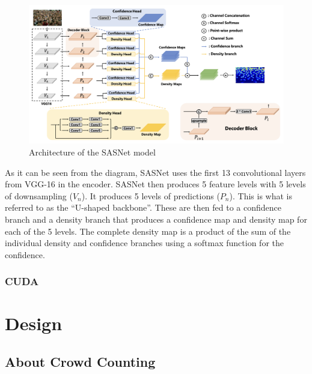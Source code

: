 \documentclass[
]{article}
\begin{document}
\begin{figure}

{\centering \includegraphics{../images/sasnet-architechture.png}

}

\caption{\label{fig-sasnet}Architecture of the SASNet model
\autocite[Diagram from][]{sasnet}}

\end{figure}

As it can be seen from the diagram, SASNet uses the first 13
convolutional layers from VGG-16 \autocite{simonyan2014very} in the
encoder. SASNet then produces 5 feature levels with 5 levels of
downsampling (\(V_n\)). It produces 5 levels of predictions (\(P_n\)).
This is what is referred to as the ``U-shaped backbone''. These are then
fed to a confidence branch and a density branch that produces a
confidence map and density map for each of the 5 levels. The complete
density map is a product of the sum of the individual density and
confidence branches using a softmax function for the confidence.

\hypertarget{cuda}{%
\subsubsection{CUDA}\label{cuda}}

\newpage{}

\hypertarget{design}{%
\section{Design}\label{design}}

\hypertarget{about-crowd-counting}{%
\subsection{About Crowd Counting}\label{about-crowd-counting}}
\end{document}
